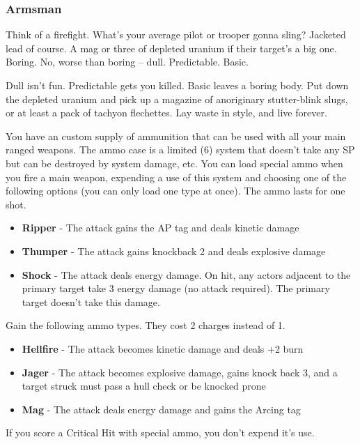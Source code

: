 \subsubsection{Armsman}

\begin{talent}
{Think of a firefight. What’s your average pilot or trooper gonna sling? Jacketed lead of course. A mag or three of depleted uranium if their target’s a big one. Boring. No, worse than boring -- dull. Predictable. Basic.

Dull isn’t fun. Predictable gets you killed. Basic leaves a boring body. Put down the depleted uranium and pick up a magazine of anoriginary stutter-blink slugs, or at least a pack of tachyon flechettes. Lay waste in style, and live forever.}

  You have an custom supply of ammunition that can be used with all your main ranged weapons. The ammo case is a limited (6) system that doesn’t take any SP but can be destroyed by system damage, etc. You can load special ammo when you fire a main weapon, expending a use of this system and choosing one of the following options (you can only load one type at once). The ammo lasts for one shot.
\begin{itemize}
\item \textbf{Ripper} - The attack gains the AP tag and deals kinetic damage 
\item \textbf{Thumper} - The attack gains knockback 2 and deals explosive damage 
\item \textbf{Shock} - The attack deals energy damage. On hit, any actors adjacent to the primary target take 3 energy damage (no attack required). The primary target doesn’t take this damage.
\end{itemize}
Gain the following ammo types. They cost 2 charges instead of 1.
\begin{itemize}
\item \textbf{Hellfire} - The attack becomes kinetic damage and deals +2 burn 
\item \textbf{Jager} - The attack becomes explosive damage, gains knock back 3, and a target struck must pass a hull check or be knocked prone 
\item \textbf{Mag} - The attack deals energy damage and gains the Arcing tag
\end{itemize}
If you score a Critical Hit with special ammo, you don’t expend it’s use.
\end{talent}
